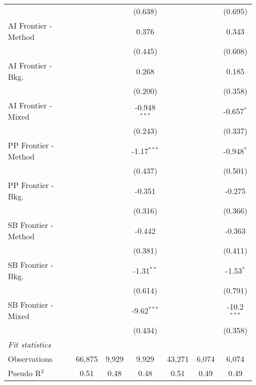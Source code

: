 \begin{tabular}{lcccccc}
                        &              &              & (0.638)        &         &         & (0.695)\\   
   AI Frontier - Method &              &              & 0.376          &         &         & 0.343\\   
                        &              &              & (0.445)        &         &         & (0.608)\\   
   AI Frontier - Bkg.   &              &              & 0.268          &         &         & 0.185\\   
                        &              &              & (0.200)        &         &         & (0.358)\\   
   AI Frontier - Mixed  &              &              & -0.948$^{***}$ &         &         & -0.657$^{*}$\\   
                        &              &              & (0.243)        &         &         & (0.337)\\   
   PP Frontier - Method &              &              & -1.17$^{***}$  &         &         & -0.948$^{*}$\\   
                        &              &              & (0.437)        &         &         & (0.501)\\   
   PP Frontier - Bkg.   &              &              & -0.351         &         &         & -0.275\\   
                        &              &              & (0.316)        &         &         & (0.366)\\   
   SB Frontier - Method &              &              & -0.442         &         &         & -0.363\\   
                        &              &              & (0.381)        &         &         & (0.411)\\   
   SB Frontier - Bkg.   &              &              & -1.31$^{**}$   &         &         & -1.53$^{*}$\\   
                        &              &              & (0.614)        &         &         & (0.791)\\   
   SB Frontier - Mixed  &              &              & -9.62$^{***}$  &         &         & -10.2$^{***}$\\   
                        &              &              & (0.434)        &         &         & (0.358)\\   
   \midrule
   \emph{Fit statistics}\\
   Observations         & 66,875       & 9,929        & 9,929          & 43,271  & 6,074   & 6,074\\  
   Pseudo R$^2$         & 0.51         & 0.48         & 0.48           & 0.51    & 0.49    & 0.49\\  
   

\end{tabular}

